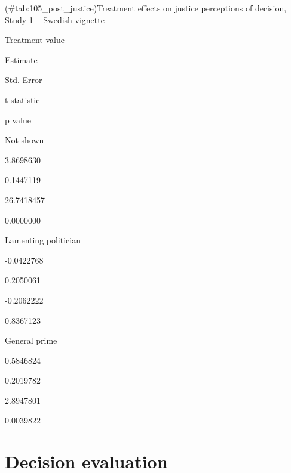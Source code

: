 \documentclass[]{book}
\begin{document}
(\#tab:105\_post\_justice)Treatment effects on justice perceptions of
decision, Study 1 -- Swedish vignette

Treatment value

Estimate

Std. Error

t-statistic

p value

Not shown

3.8698630

0.1447119

26.7418457

0.0000000

Lamenting politician

-0.0422768

0.2050061

-0.2062222

0.8367123

General prime

0.5846824

0.2019782

2.8947801

0.0039822

\section{Decision evaluation}\label{decision-evaluation-1}
\end{document}
